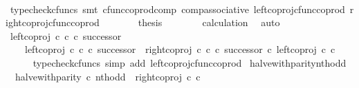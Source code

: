\begin{isabellebody}
\ \ \ \ \ \ \isamarkupfalse%
\ {\isacharparenleft}{\kern0pt}typecheck{\isacharunderscore}{\kern0pt}cfuncs{\isacharcomma}{\kern0pt}\ smt\ cfunc{\isacharunderscore}{\kern0pt}coprod{\isacharunderscore}{\kern0pt}comp\ comp{\isacharunderscore}{\kern0pt}associative{}\ left{\isacharunderscore}{\kern0pt}coproj{\isacharunderscore}{\kern0pt}cfunc{\isacharunderscore}{\kern0pt}coprod\ right{\isacharunderscore}{\kern0pt}coproj{\isacharunderscore}{\kern0pt}cfunc{\isacharunderscore}{\kern0pt}coprod{\isacharparenright}{\kern0pt}\isanewline
\ \ \ \ \isamarkupfalse%
\ \isamarkupfalse%
\ {\isacharquery}{\kern0pt}thesis\isanewline
\ \ \ \ \ \ \isamarkupfalse%
\ calculation\ \isamarkupfalse%
\ auto\isanewline
\ \ \isamarkupfalse%
\isanewline
\isanewline
\ \ \isamarkupfalse%
\ {\isachardoublequoteopen}left{\isacharunderscore}{\kern0pt}coproj\ {\isasymnat}\isactrlsub c\ {\isasymnat}\isactrlsub c\ {\isasymcirc}\isactrlsub c\ successor\ {\isacharequal}{\kern0pt}\isanewline
\ \ \ \ {\isacharparenleft}{\kern0pt}left{\isacharunderscore}{\kern0pt}coproj\ {\isasymnat}\isactrlsub c\ {\isasymnat}\isactrlsub c\ {\isasymcirc}\isactrlsub c\ successor{\isacharparenright}{\kern0pt}\ {\isasymamalg}\ {\isacharparenleft}{\kern0pt}right{\isacharunderscore}{\kern0pt}coproj\ {\isasymnat}\isactrlsub c\ {\isasymnat}\isactrlsub c\ {\isasymcirc}\isactrlsub c\ successor{\isacharparenright}{\kern0pt}\ {\isasymcirc}\isactrlsub c\ left{\isacharunderscore}{\kern0pt}coproj\ {\isasymnat}\isactrlsub c\ {\isasymnat}\isactrlsub c{\isachardoublequoteclose}\isanewline
\ \ \ \ \isamarkupfalse%
\ {\isacharparenleft}{\kern0pt}typecheck{\isacharunderscore}{\kern0pt}cfuncs{\isacharcomma}{\kern0pt}\ simp\ add{\isacharcolon}{\kern0pt}\ left{\isacharunderscore}{\kern0pt}coproj{\isacharunderscore}{\kern0pt}cfunc{\isacharunderscore}{\kern0pt}coprod{\isacharparenright}{\kern0pt}\isanewline
{}\isamarkupfalse%
%
\endisatagproof
{\isafoldproof}%
%
\isadelimproof
\isanewline
%
\endisadelimproof
\isanewline
{}\isamarkupfalse%
\ halve{\isacharunderscore}{\kern0pt}with{\isacharunderscore}{\kern0pt}parity{\isacharunderscore}{\kern0pt}nth{\isacharunderscore}{\kern0pt}odd{\isacharcolon}{\kern0pt}\isanewline
\ \ {\isachardoublequoteopen}halve{\isacharunderscore}{\kern0pt}with{\isacharunderscore}{\kern0pt}parity\ {\isasymcirc}\isactrlsub c\ nth{\isacharunderscore}{\kern0pt}odd\ {\isacharequal}{\kern0pt}\ right{\isacharunderscore}{\kern0pt}coproj\ {\isasymnat}\isactrlsub c\ {\isasymnat}\isactrlsub c{\isachardoublequoteclose}\isanewline

\end{isabellebody}

